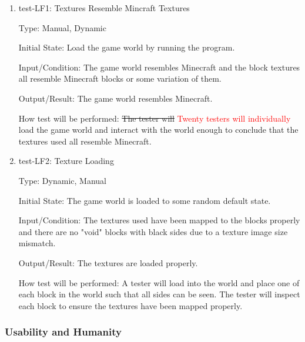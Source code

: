 \documentclass[12pt, titlepage]{article}
\begin{document}
\begin{enumerate}

\item{test-LF1: Textures Resemble Mincraft Textures\\}

Type: Manual, Dynamic
					
Initial State: Load the game world by running the program.
					
Input/Condition: The game world resembles Minecraft and the block textures all resemble Minecraft blocks or some variation of them.
					
Output/Result: The game world resembles Minecraft.
					
How test will be performed: \sout{The tester will} \textcolor{red}{Twenty testers will individually} load the game world and interact with the world enough to conclude that the textures used all resemble Minecraft.

\item{test-LF2: Texture Loading\\}

Type: Dynamic, Manual
					
Initial State: The game world is loaded to some random default state.
					
Input/Condition: The textures used have been mapped to the blocks properly and there are no "void" blocks with black sides due to a texture image size mismatch.
					
Output/Result: The textures are loaded properly.
					
How test will be performed: A tester will load into the world and place one of each block in the world such that all sides can be seen. The tester will inspect each block to ensure the textures have been mapped properly.

\end{enumerate}

\subsubsection{Usability and Humanity}
\end{document}
